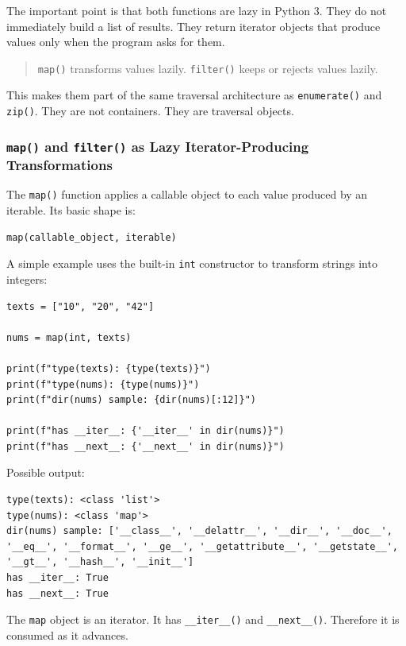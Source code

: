 \documentclass[a4paper,twoside]{report}
\begin{document}
The important point is that both functions are lazy in Python 3. They do not immediately build a list of results. They return iterator objects that produce values only when the program asks for them.

\begin{quote}
\texttt{map()} transforms values lazily. \texttt{filter()} keeps or rejects values lazily.
\end{quote}

This makes them part of the same traversal architecture as \texttt{enumerate()} and \texttt{zip()}. They are not containers. They are traversal objects.

\subsubsection{\texttt{map()} and \texttt{filter()} as Lazy Iterator-Producing Transformations}

The \texttt{map()} function applies a callable object to each value produced by an iterable. Its basic shape is:

\begin{verbatim}
map(callable_object, iterable)
\end{verbatim}

A simple example uses the built-in \texttt{int} constructor to transform strings into integers:

\begin{verbatim}
texts = ["10", "20", "42"]

nums = map(int, texts)

print(f"type(texts): {type(texts)}")
print(f"type(nums): {type(nums)}")
print(f"dir(nums) sample: {dir(nums)[:12]}")

print(f"has __iter__: {'__iter__' in dir(nums)}")
print(f"has __next__: {'__next__' in dir(nums)}")
\end{verbatim}

Possible output:

\begin{verbatim}
type(texts): <class 'list'>
type(nums): <class 'map'>
dir(nums) sample: ['__class__', '__delattr__', '__dir__', '__doc__',
'__eq__', '__format__', '__ge__', '__getattribute__', '__getstate__',
'__gt__', '__hash__', '__init__']
has __iter__: True
has __next__: True
\end{verbatim}

The \texttt{map} object is an iterator. It has \texttt{\_\_iter\_\_()} and \texttt{\_\_next\_\_()}. Therefore it is consumed as it advances.
\end{document}
